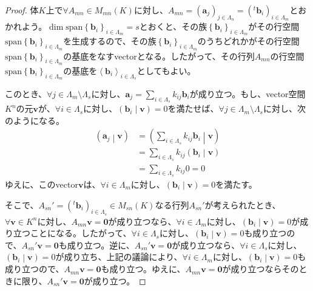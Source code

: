 \documentclass[dvipdfmx]{jsarticle}
\begin{document}
\begin{proof}
体$K$上で$\forall A_{mn} \in M_{mn}(K)$に対し、$A_{mn} = \left( \mathbf{a}_{j} \right)_{j \in \varLambda_{n}} = \left(^{t}\mathbf{b}_{i} \right)_{i \in \varLambda_{m}}$とおかれよう。$\dim{{\mathrm{span} }\left\{ \mathbf{b}_{i} \right\}_{i \in \varLambda_{m}}} = s$とおくと、その族$\left\{ \mathbf{b}_i \right\}_{i \in \varLambda_{m} } $がその行空間${\mathrm{span} }\left\{ \mathbf{b}_{i} \right\}_{i \in \varLambda_{m}}$を生成するので、その族$\left\{ \mathbf{b}_i \right\}_{i \in \varLambda_{m} } $のうちどれかがその行空間${\mathrm{span} }\left\{ \mathbf{b}_{i} \right\}_{i \in \varLambda_{m}}$の基底をなすvectorとなる。したがって、その行列$A_{mn}$の行空間${\mathrm{span} }\left\{ \mathbf{b}_{i} \right\}_{i \in \varLambda_{m}}$の基底を$\left\langle \mathbf{b}_{i} \right\rangle_{i \in \varLambda_{s}}$としてもよい。\par
このとき、$\forall j \in \varLambda_{m} \setminus \varLambda_{s}$に対し、$\mathbf{a}_{j} = \sum_{i \in \varLambda_{s}} {k_{ij}\mathbf{b}_{i}}$が成り立つ。もし、vector空間$K^{n}$の元$\mathbf{v}$が、$\forall i \in \varLambda_{s}$に対し、$\left( \mathbf{b}_{i} \middle| \mathbf{v} \right) = 0$を満たせば、$\forall j \in \varLambda_{m} \setminus \varLambda_{s}$に対し、次のようになる。
\begin{align*}
\left( \mathbf{a}_{j} \middle| \mathbf{v} \right) &= \left( \sum_{i \in \varLambda_{s}} {k_{ij}\mathbf{b}_{i}} \middle| \mathbf{v} \right)\\
&= \sum_{i \in \varLambda_{s}} {k_{ij}\left( \mathbf{b}_{i} \middle| \mathbf{v} \right)}\\
&= \sum_{i \in \varLambda_{s}} {k_{ij}0} = 0
\end{align*}
ゆえに、このvector$\mathbf{v}$は、$\forall i \in \varLambda_{m}$に対し、$\left( \mathbf{b}_{i} \middle| \mathbf{v} \right) = 0$を満たす。\par
そこで、$A_{sn}' = \left(^{t}\mathbf{b}_{i} \right)_{i \in \varLambda_{s}} \in M_{sn}(K)$なる行列$A_{sn}'$が考えられたとき、$\forall\mathbf{v} \in K^{n}$に対し、$A_{mn}\mathbf{v} = \mathbf{0}$が成り立つなら、$\forall i \in \varLambda_{m}$に対し、$\left( \mathbf{b}_{i} \middle| \mathbf{v} \right) = 0$が成り立つことになる。したがって、$\forall i \in \varLambda_{s}$に対し、$\left( \mathbf{b}_{i} \middle| \mathbf{v} \right) = 0$も成り立つので、$A_{sn}'\mathbf{v} = \mathbf{0}$も成り立つ。逆に、$A_{sn}'\mathbf{v} = \mathbf{0}$が成り立つなら、$\forall i \in \varLambda_{s}$に対し、$\left( \mathbf{b}_{i} \middle| \mathbf{v} \right) = 0$が成り立ち、上記の議論により、$\forall i \in \varLambda_{m}$に対し、$\left( \mathbf{b}_{i} \middle| \mathbf{v} \right) = 0$も成り立つので、$A_{mn}\mathbf{v} = \mathbf{0}$も成り立つ。ゆえに、$A_{mn}\mathbf{v} = \mathbf{0}$が成り立つならそのときに限り、$A_{sn}'\mathbf{v} = \mathbf{0}$が成り立つ。\par

\end{proof}
\end{document}
